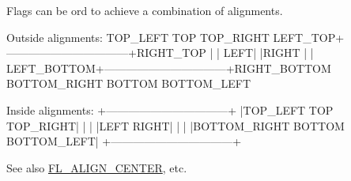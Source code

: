Flags can be or\textquotesingle{}d to achieve a combination of alignments.


\begin{DoxyCode}
Outside alignments:
           TOP\_LEFT        TOP       TOP\_RIGHT
   LEFT\_TOP+---------------------------------+RIGHT\_TOP
           |                                 |
       LEFT|                                 |RIGHT
           |                                 |
LEFT\_BOTTOM+---------------------------------+RIGHT\_BOTTOM
           BOTTOM\_RIGHT   BOTTOM   BOTTOM\_LEFT

Inside alignments:
           +---------------------------------+
           |TOP\_LEFT       TOP      TOP\_RIGHT|
           |                                 |
           |LEFT                        RIGHT|
           |                                 |
           |BOTTOM\_RIGHT  BOTTOM  BOTTOM\_LEFT|
           +---------------------------------+
\end{DoxyCode}
 \begin{DoxySeeAlso}{See also}
\hyperlink{_enumerations_8_h_a427f1ce53c37478a59f64bec4a2e2241}{F\+L\+\_\+\+A\+L\+I\+G\+N\+\_\+\+C\+E\+N\+T\+ER}, etc. 
\end{DoxySeeAlso}
